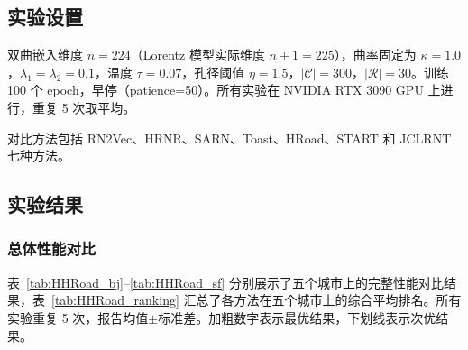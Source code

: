 \subsection{实验设置}

双曲嵌入维度 $n=224$（Lorentz 模型实际维度 $n+1=225$），曲率固定为 $\kappa=1.0$，$\lambda_1=\lambda_2=0.1$，温度 $\tau=0.07$，孔径阈值 $\eta=1.5$，$|\mathcal{C}|=300$，$|\mathcal{R}|=30$。训练 100 个 epoch，早停（patience=50）。所有实验在 NVIDIA RTX 3090 GPU 上进行，重复 5 次取平均。

对比方法包括 RN2Vec\cite{wang2019rn2vec}、HRNR\cite{wu2020hrnr}、SARN\cite{li2023sarn}、Toast\cite{chen2021toast}、HRoad\cite{lin2023hroad}、START\cite{chen2022start} 和 JCLRNT\cite{mao2022jclrnt} 七种方法。

\subsection{实验结果}

\subsubsection{总体性能对比}

表~\ref{tab:HHRoad_bj}--\ref{tab:HHRoad_sf} 分别展示了五个城市上的完整性能对比结果，表~\ref{tab:HHRoad_ranking} 汇总了各方法在五个城市上的综合平均排名。所有实验重复 5 次，报告均值$\pm$标准差。加粗数字表示最优结果，下划线表示次优结果。

